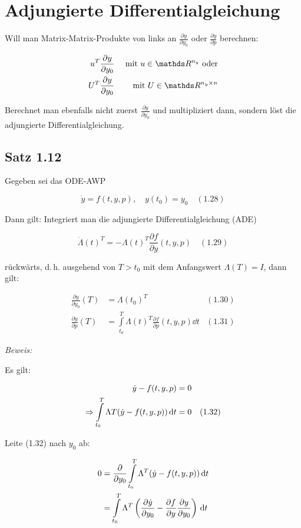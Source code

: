 \section*{Adjungierte Differentialgleichung}

Will man Matrix-Matrix-Produkte von links an $\tfrac{\partial y}{\partial y_0}$ oder $\tfrac{\partial y}{\partial p}$ berechnen:

\begin{align*}
u^T \frac{\partial y}{\partial y_0} & & \text{ mit } u\in\R^{n_y} \text{ oder} \\
U^T \frac{\partial y}{\partial y_0} & & \text{ mit } U \in \R^{n_y \times n}
\end{align*}

Berechnet man ebenfalls nicht zuerst $\frac{\partial y}{\partial y_0}$ und multipliziert dann, sondern löst die adjungierte Differentialgleichung.

\subsection*{Satz 1.12}

Gegeben sei das ODE-AWP

\[ \dot y = f(t,y,p), \quad y(t_0) = y_0 \quad (1.28) \]

Dann gilt: Integriert man die adjungierte Differentialgleichung (ADE)

\[ \dot \Lambda (t)^T = -\Lambda(t)^T \frac{\partial f}{\partial y} (t,y,p) \quad (1.29) \]

rückwärts, d.\,h. ausgehend von $T > t_0$ mit dem Anfangswert $\Lambda(T) = I$, dann gilt:

\begin{align*}
\frac{\partial y}{\partial y_0} (T) &= \Lambda (t_0)^T & (1.30) \\
\frac{\partial y}{\partial p} (T) &= \int\limits_{t_0}^T \Lambda(t)^T \frac{\partial f}{\partial p} (t,y,p) \dd t & (1.31)
\end{align*}

\emph{Beweis:}

Es gilt:

\begin{align*}
\dot y - f(t,y,p) &= 0 \\
\Rightarrow \int\limits_{t_0}^T \Lambda T (\dot y - f(t,y,p)) \,\mathrm d t &= 0 & (1.32)
\end{align*}

Leite (1.32) nach $y_0$ ab:

\begin{align*}
0 &= \frac{\partial}{\partial y_0} \int\limits_{t_0}^T \Lambda^T (\dot y -f(t,y,p)) \,\mathrm d t \\
&= \int\limits_{t_0}^T \Lambda^T \left( \frac{\partial \dot y}{\partial y_0} - \frac{\partial f}{\partial y} \frac{\partial y}{\partial y_0} \right) \,\mathrm d t
\end{align*}

